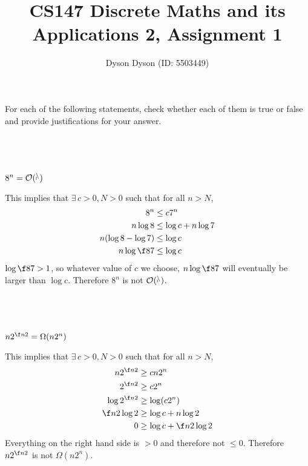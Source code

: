 \documentclass[a4paper]{article}
\title{CS147 Discrete Maths and its Applications 2, Assignment 1}
\author{Dyson Dyson (ID: 5503449)} %
\begin{document}
\maketitle

\setlength{\parindent}{0em}
\setlength{\parskip}{1em}


\begin{questionbody}
For each of the following statements, check whether each of them is true or false and provide justifications for your answer.
\end{questionbody}

\subsection{~} %

\begin{questionbody}
$8^n = \cal O(7^n)$
\end{questionbody}

This implies that $\exists\, c > 0, N > 0$ such that for all $n > N$, \begin{align*}
8^n &\le c 7^n\\
n \log 8 &\le \log c + n \log 7\\
n (\log 8 - \log 7) &\le \log c\\
n \log \f87 &\le \log c
\end{align*}
$\log \f87 > 1$, so whatever value of $c$ we choose, $n \log \f87$ will eventually be larger than $\log c$. Therefore $8^n$ is not $\cal O(7^n)$.

\subsection{~} %

\begin{questionbody}
$n 2^{\f n2} = \Omega(n 2^n)$
\end{questionbody}

This implies that $\exists\, c > 0, N > 0$ such that for all $n > N$, \begin{align*}
n 2^{\f n2} &\ge c n 2^n\\
2^{\f n2} &\ge c 2^n\\
\log 2^{\f n2} &\ge \log (c 2^n)\\
\f n2 \log 2 &\ge \log c + n \log 2\\
0 &\ge \log c + \f n2 \log 2
\end{align*}
Everything on the right hand side is $>0$ and therefore not $\le 0$. Therefore $n 2^{\f n2}$ is not $\Omega(n 2^n)$.
\end{document}
